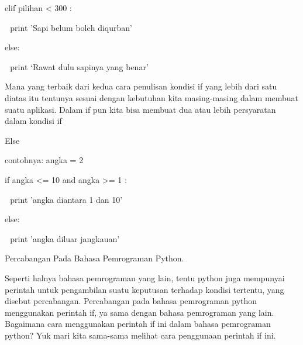 \noindent 
\vspace{\baselineskip}
elif pilihan <  $  $300 : \par
\noindent 
\vspace{\baselineskip}
 $  $  $  $ print 'Sapi belum boleh diqurban' \par
\noindent 
\vspace{\baselineskip}
else: \par
\noindent 
\vspace{\baselineskip}
 $  $  $  $ print ‘Rawat dulu sapinya yang benar' \par
\noindent 
\vspace{\baselineskip}
Mana yang terbaik dari kedua cara penulisan kondisi if yang lebih dari satu diatas itu tentunya sesuai dengan kebutuhan kita masing-masing dalam membuat suatu aplikasi. Dalam if pun kita bisa membuat dua atau lebih persyaratan dalam kondisi if \par
\noindent 
\vspace{\baselineskip}
\vspace{\baselineskip}
Else \par
\noindent 
\vspace{\baselineskip}
contohnya:\vspace{\baselineskip}
angka = 2 \par
\noindent 
\vspace{\baselineskip}
if angka <= 10 and angka >= 1 : \par
\noindent 
\vspace{\baselineskip}
 $  $  $  $ print 'angka diantara 1 dan 10' \par
\noindent 
\vspace{\baselineskip}
else: \par
\noindent 
\vspace{\baselineskip}
 $  $  $  $ print 'angka diluar jangkauan' \par
\vspace{12pt}
\noindent 
Percabangan Pada Bahasa Pemrograman Python. \par
\vspace{12pt}
\noindent 
Seperti halnya bahasa pemrograman yang lain, tentu python juga mempunyai perintah untuk pengambilan suatu keputusan terhadap kondisi tertentu, yang disebut percabangan. Percabangan pada bahasa pemrograman python menggunakan perintah $  $if, ya sama dengan bahasa pemrograman yang lain. Bagaimana cara menggunakan perintah $  $if $  $ini dalam bahasa pemrograman python? Yuk mari kita sama-sama melihat cara penggunaan perintah $  $if $  $ini. \par

